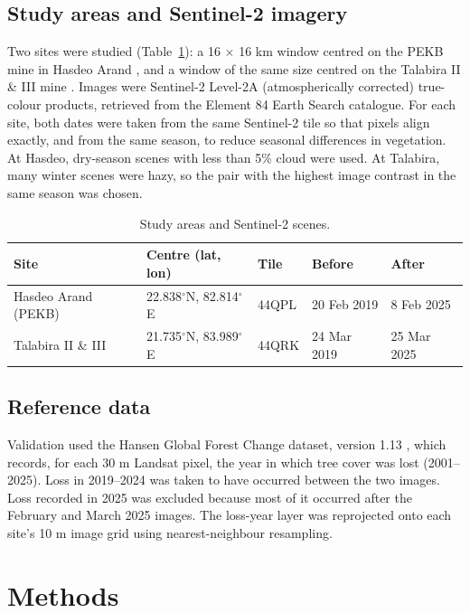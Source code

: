 \documentclass[11pt]{article}
\begin{document}
\subsection{Study areas and Sentinel-2 imagery}
Two sites were studied (Table~\ref{tab:scenes}): a 16 $\times$ 16 km window centred on the PEKB mine in Hasdeo Arand \citep{gem_pekb}, and a window of the same size centred on the Talabira II \& III mine \citep{gem_talabira}. Images were Sentinel-2 Level-2A (atmospherically corrected) true-colour products, retrieved from the Element 84 Earth Search catalogue. For each site, both dates were taken from the same Sentinel-2 tile so that pixels align exactly, and from the same season, to reduce seasonal differences in vegetation. At Hasdeo, dry-season scenes with less than 5\% cloud were used. At Talabira, many winter scenes were hazy, so the pair with the highest image contrast in the same season was chosen.

\begin{table}[H]
\centering
\caption{Study areas and Sentinel-2 scenes.}
\label{tab:scenes}
\begin{tabular}{lllll}
\toprule
Site & Centre (lat, lon) & Tile & Before & After \\
\midrule
Hasdeo Arand (PEKB) & 22.838$^\circ$N, 82.814$^\circ$E & 44QPL & 20 Feb 2019 & 8 Feb 2025 \\
Talabira II \& III & 21.735$^\circ$N, 83.989$^\circ$E & 44QRK & 24 Mar 2019 & 25 Mar 2025 \\
\bottomrule
\end{tabular}
\end{table}

\subsection{Reference data}
Validation used the Hansen Global Forest Change dataset, version 1.13 \citep{hansen2013}, which records, for each 30 m Landsat pixel, the year in which tree cover was lost (2001--2025). Loss in 2019--2024 was taken to have occurred between the two images. Loss recorded in 2025 was excluded because most of it occurred after the February and March 2025 images. The loss-year layer was reprojected onto each site's 10 m image grid using nearest-neighbour resampling.

\section{Methods}
\end{document}
